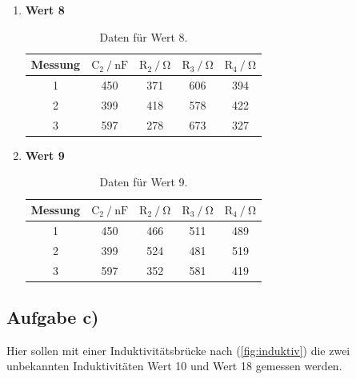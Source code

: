 \begin{enumerate}
\item \textbf{Wert 8}

\begin{table}
\centering
\begin{tabular}{c c c c c}
\toprule
{Messung} & {$\text{C}_2 \mathbin{/} \si{\nano\farad}$} &{$ \text{R}_2 \mathbin{/} \si{\ohm} $} & {$ \text{R}_3 \mathbin{/} \si{\ohm} $} & {$ \text{R}_4 \mathbin{/} \si{\ohm} $} \\
\midrule
1 & 450 & 371 & 606 & 394 \\
2 & 399 & 418 & 578 & 422 \\
3 & 597 & 278 & 673 & 327 \\
\bottomrule
\end{tabular}
\caption{Daten für Wert 8.}
\label{tab:ab8}
\end{table}

\newpage

\item \textbf{Wert 9}

\begin{table}
\centering
\begin{tabular}{c c c c c}
\toprule
{Messung} & {$\text{C}_2 \mathbin{/} \si{\nano\farad}$} &{$ \text{R}_2 \mathbin{/} \si{\ohm} $} & {$ \text{R}_3 \mathbin{/} \si{\ohm} $} & {$ \text{R}_4 \mathbin{/} \si{\ohm} $} \\
\midrule
1 & 450 & 466 & 511 & 489 \\
2 & 399 & 524 & 481 & 519 \\
3 & 597 & 352 & 581 & 419 \\
\bottomrule
\end{tabular}
\caption{Daten für Wert 9.}
\label{tab:ab9}
\end{table}

\end{enumerate}

\subsection{Aufgabe c)}

Hier sollen mit einer Induktivitätsbrücke nach (\ref{fig:induktiv}) die zwei unbekannten Induktivitäten Wert 10 und Wert 18 gemessen werden.

